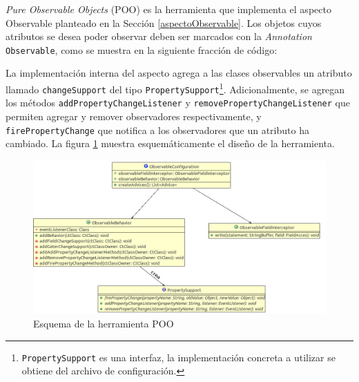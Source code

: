 	\emph{Pure Observable Objects} (POO) es la herramienta que implementa el
	aspecto Observable planteado en la Sección \ref{aspectoObservable}.
	Los objetos cuyos atributos se desea poder observar deben ser marcados con
	la \emph{Annotation} \lstinline|Observable|, como
	se muestra en la siguiente fracción de código:
	
	
	La implementación interna del aspecto agrega a las clases observables un
	atributo llamado \lstinline|changeSupport| del tipo
	\lstinline|PropertySupport|\footnote{\lstinline|PropertySupport| es una
	interfaz, la implementación concreta a utilizar se obtiene del archivo de
	configuración.}.
	Adicionalmente, se agregan los métodos 
	\lstinline|addPropertyChangeListener| y
	\lstinline|removePropertyChangeListener| que permiten agregar 
	y remover observadores respectivamente, y \lstinline|firePropertyChange|
	que notifica a los observadores que un atributo ha cambiado.
	La figura \ref{umlpoo} muestra esquemáticamente el diseño de la herramienta.
	
	\begin{figure}[hbt]
		\centering
		\includegraphics[scale=0.45]{img/poo}
	 	\caption{Esquema de la herramienta POO}
	 	\label{umlpoo}
	\end{figure}
	
